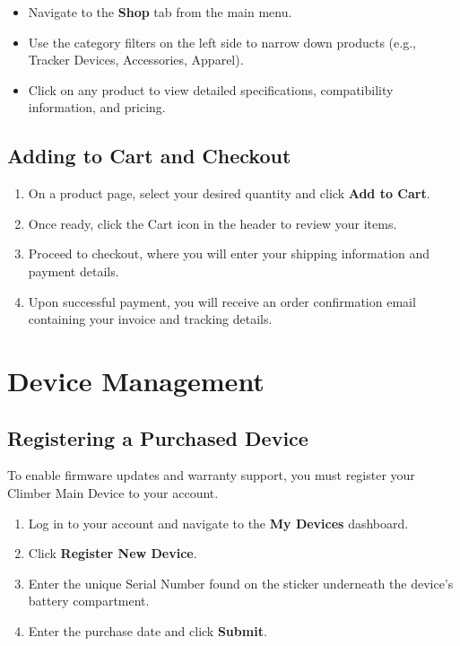 \begin{itemize}
    \item Navigate to the \textbf{Shop} tab from the main menu.
    \item Use the category filters on the left side to narrow down products (e.g., Tracker Devices, Accessories, Apparel).
    \item Click on any product to view detailed specifications, compatibility information, and pricing.
\end{itemize}

\subsection{Adding to Cart and Checkout}
\begin{enumerate}
    \item On a product page, select your desired quantity and click \textbf{Add to Cart}.
    \item Once ready, click the Cart icon in the header to review your items.
    \item Proceed to checkout, where you will enter your shipping information and payment details.
    \item Upon successful payment, you will receive an order confirmation email containing your invoice and tracking details.
\end{enumerate}

\section{Device Management}

\subsection{Registering a Purchased Device}
To enable firmware updates and warranty support, you must register your Climber Main Device to your account.

\begin{enumerate}
    \item Log in to your account and navigate to the \textbf{My Devices} dashboard.
    \item Click \textbf{Register New Device}.
    \item Enter the unique Serial Number found on the sticker underneath the device's battery compartment.
    \item Enter the purchase date and click \textbf{Submit}.
\end{enumerate}

